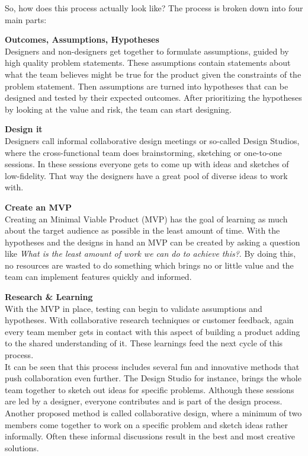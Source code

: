 So, how does this process actually look like? The process is broken down into four main parts:


\textbf{Outcomes, Assumptions, Hypotheses} \\ %
Designers and non-designers get together to formulate assumptions, guided by high quality problem
statements. These assumptions contain statements about what the team believes might be true for the
product given the constraints of the problem statement. Then assumptions are turned into hypotheses
that can be designed and tested by their expected outcomes. After prioritizing the hypotheses by
looking at the value and risk, the team can start designing.

\textbf{Design it} \\
Designers call informal collaborative design meetings or so-called Design Studios, where the
cross-functional team does brainstorming, sketching or one-to-one sessions. In these sessions
everyone gets to come up with ideas and sketches of low-fidelity. That way the designers have a
great pool of diverse ideas to work with.  
 
\textbf{Create an MVP} \\
Creating an Minimal Viable Product (MVP) has the goal of learning as much about the target audience
as possible in the least amount of time. With the hypotheses and the designs in hand an MVP can be
created by asking a question like \textit{What is the least amount of work we can do to achieve
this?}. By doing this, no resources are wasted to do something which brings no or little value and
the team can implement features quickly and informed.

\textbf{Research \& Learning} \\
With the MVP in place, testing can begin to validate assumptions and hypotheses. With collaborative
research techniques or customer feedback, again every team member gets in contact with this aspect
of building a product adding to the shared understanding of it. These learnings feed the next cycle
of this process.  \\

It can be seen that this process includes several fun and innovative methods that push collaboration
even further. The Design Studio for instance, brings the whole team together to sketch out ideas for
specific problems. Although these sessions are led by a designer, everyone contributes and is part
of the design process.  
Another proposed method is called collaborative design, where a minimum of two members come together
to work on a specific problem and sketch ideas rather informally. Often these informal discussions
result in the best and most creative solutions.

